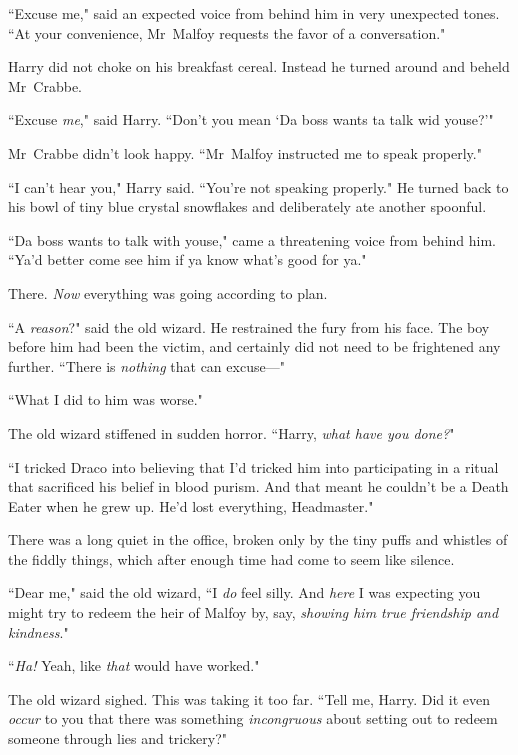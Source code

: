 ``Excuse me," said an expected voice from behind him in very unexpected tones. ``At your convenience, Mr~Malfoy requests the favor of a conversation."

Harry did not choke on his breakfast cereal. Instead he turned around and beheld Mr~Crabbe.

``Excuse \emph{me}," said Harry. ``Don't you mean `Da boss wants ta talk wid youse?'"

Mr~Crabbe didn't look happy. ``Mr~Malfoy instructed me to speak properly."

``I can't hear you," Harry said. ``You're not speaking properly." He turned back to his bowl of tiny blue crystal snowflakes and deliberately ate another spoonful.

``Da boss wants to talk with youse," came a threatening voice from behind him. ``Ya'd better come see him if ya know what's good for ya."

There. \emph{Now} everything was going according to plan.


``A \emph{reason}?" said the old wizard. He restrained the fury from his face. The boy before him had been the victim, and certainly did not need to be frightened any further. ``There is \emph{nothing} that can excuse—"

``What I did to him was worse."

The old wizard stiffened in sudden horror. ``Harry, \emph{what have you done?}"

``I tricked Draco into believing that I'd tricked him into participating in a ritual that sacrificed his belief in blood purism. And that meant he couldn't be a Death Eater when he grew up. He'd lost everything, Headmaster."

There was a long quiet in the office, broken only by the tiny puffs and whistles of the fiddly things, which after enough time had come to seem like silence.

``Dear me," said the old wizard, ``I \emph{do} feel silly. And \emph{here} I was expecting you might try to redeem the heir of Malfoy by, say, \emph{showing him true friendship and kindness}."

``\emph{Ha!} Yeah, like \emph{that} would have worked."

The old wizard sighed. This was taking it too far. ``Tell me, Harry. Did it even \emph{occur} to you that there was something \emph{incongruous} about setting out to redeem someone through lies and trickery?"

